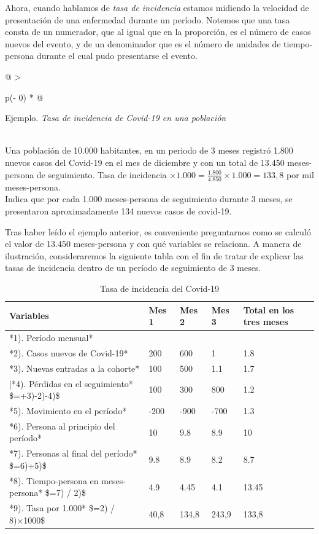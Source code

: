 \documentclass[
  11pt,
]{book}
\begin{document}
Ahora, cuando hablamos de \emph{tasa de incidencia} estamos midiendo la velocidad de presentación de una enfermedad durante un período. Notemos que una tasa consta de un numerador, que al igual que en la proporción, es el número de casos nuevos del evento, y de un denominador que es el número de unidades de tiempo-persona durante el cual pudo presentarse el evento.

\begin{longtable}[]{@{}
  >{\raggedright\arraybackslash}p{(\columnwidth - 0\tabcolsep) * }@{}}
\toprule
\begin{minipage}[b]{\linewidth}\raggedright
Ejemplo. \emph{Tasa de incidencia de Covid-19 en una población}
\end{minipage} \\
\midrule
\endhead
Una población de 10.000 habitantes, en un periodo de 3 meses registró 1.800 nuevos casos del Covid-19 en el mes de diciembre y con un total de 13.450 meses-persona de seguimiento. Tasa de incidencia \(\times 1.000=\frac{1.800}{4.850}\times 1.000=133,8\) por mil meses-persona. \\
Indica que por cada 1.000 meses-persona de seguimiento durante 3 meses, se presentaron aproximadamente 134 nuevos casos de covid-19. \\
\bottomrule
\end{longtable}

Tras haber leído el ejemplo anterior, es conveniente preguntarnos como se calculó el valor de 13.450 meses-persona y con qué variables se relaciona. A manera de ilustración, consideraremos la siguiente tabla con el fin de tratar de explicar las tasas de incidencia dentro de un período de seguimiento de 3 meses.

\begin{table}

\caption{\label{tab:covid}Tasa de incidencia del Covid-19}
\centering
\begin{tabular}[t]{l|l|l|l|l}
\hline
Variables & Mes 1 & Mes 2 & Mes 3 & Total en los tres meses \\
\hline
*1). Período mensual* &  &  &  & \\
\hline
*2). Casos nuevos de Covid-19* & 200 & 600 & 1 & 1.8\\
\hline
*3). Nuevas entradas a la cohorte* & 100 & 500 & 1.1 & 1.7\\
\hline
|*4). Pérdidas en el seguimiento* \$=+3)-2)-4)\$ & 100 & 300 & 800 & 1.2\\
\hline
*5). Movimiento en el período* & -200 & -900 & -700 & 1.3\\
\hline
*6). Persona al principio del período* & 10 & 9.8 & 8.9 & 10\\
\hline
*7). Personas al final del período* \$=6)+5)\$ & 9.8 & 8.9 & 8.2 & 8.7\\
\hline
*8). Tiempo-persona en meses-persona*  \$=7) / 2)\$ & 4.9 & 4.45 & 4.1 & 13.45\\
\hline
*9). Tasa por 1.000* \$=2) / 8)×1000\$ & 40,8 & 134,8 & 243,9 & 133,8\\
\hline
\end{tabular}
\end{table}
\end{document}
